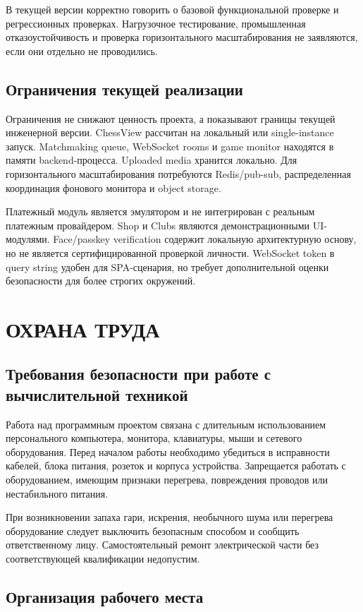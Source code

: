 \documentclass[14pt,a4paper]{extreport}
\begin{document}
В текущей версии корректно говорить о базовой функциональной проверке и регрессионных проверках. Нагрузочное тестирование, промышленная отказоустойчивость и проверка горизонтального масштабирования не заявляются, если они отдельно не проводились.

\section{Ограничения текущей реализации}

Ограничения не снижают ценность проекта, а показывают границы текущей инженерной версии. ChessView рассчитан на локальный или single-instance запуск. Matchmaking queue, WebSocket rooms и game monitor находятся в памяти backend-процесса. Uploaded media хранится локально. Для горизонтального масштабирования потребуются Redis/pub-sub, распределенная координация фонового монитора и object storage.

Платежный модуль является эмулятором и не интегрирован с реальным платежным провайдером. Shop и Clubs являются демонстрационными UI-модулями. Face/passkey verification содержит локальную архитектурную основу, но не является сертифицированной проверкой личности. WebSocket token в query string удобен для SPA-сценария, но требует дополнительной оценки безопасности для более строгих окружений.

\chapter{ОХРАНА ТРУДА}

\section{Требования безопасности при работе с вычислительной техникой}

Работа над программным проектом связана с длительным использованием персонального компьютера, монитора, клавиатуры, мыши и сетевого оборудования. Перед началом работы необходимо убедиться в исправности кабелей, блока питания, розеток и корпуса устройства. Запрещается работать с оборудованием, имеющим признаки перегрева, повреждения проводов или нестабильного питания.

При возникновении запаха гари, искрения, необычного шума или перегрева оборудование следует выключить безопасным способом и сообщить ответственному лицу. Самостоятельный ремонт электрической части без соответствующей квалификации недопустим.

\section{Организация рабочего места}
\end{document}
